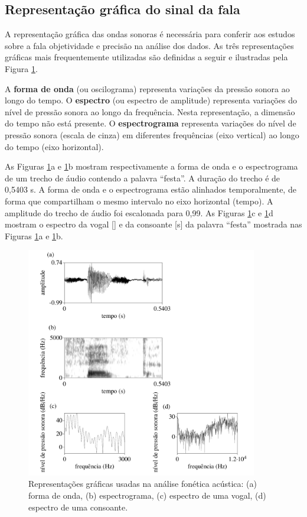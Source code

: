 \documentclass[portuguese]{textolivre}
\begin{document}
\subsection{Representação gráfica do sinal da fala}\label{sec-representacao}
A representação gráfica das ondas sonoras é necessária para conferir aos estudos sobre a fala objetividade e precisão na análise dos dados. As três representações gráficas mais frequentemente utilizadas são definidas a seguir e ilustradas pela Figura \ref{fig6}.

A \textbf{forma de onda} (ou oscilograma) representa variações da pressão sonora ao longo do tempo. O \textbf{espectro} (ou espectro de amplitude) representa variações do nível de pressão sonora ao longo da frequência. Nesta representação, a dimensão do tempo não está presente. O \textbf{espectrograma} representa variações do nível de pressão sonora (escala de cinza) em diferentes frequências (eixo vertical) ao longo do tempo (eixo horizontal).

As Figuras \ref{fig6}a e \ref{fig6}b mostram respectivamente a forma de onda e o espectrograma de um trecho de áudio contendo a palavra ``festa''. A duração do trecho é de 0,5403 s. A forma de onda e o espectrograma estão alinhados temporalmente, de forma que compartilham o mesmo intervalo no eixo horizontal (tempo). A amplitude do trecho de áudio foi escalonada para 0,99. As Figuras \ref{fig6}c e \ref{fig6}d mostram o espectro da vogal [] e da consoante [s] da palavra ``festa'' mostrada nas Figuras \ref{fig6}a e \ref{fig6}b. 

\begin{figure}[H]
 \centering
 \includegraphics[width=0.9\textwidth]{Fig6.pdf}
 \caption{Representações gráficas usadas na análise fonética acústica: (a) forma de onda, (b) espectrograma, (c) espectro de uma vogal, (d) espectro de uma consoante.}
 \label{fig6}
\end{figure}
\end{document}
